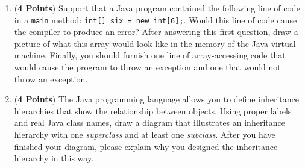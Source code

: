 \documentclass[12pt]{article}
\begin{document}
\begin{enumerate}
\begin{enumerate}

\item ({\bf 4 Points}) Support that a Java program contained the
  following line of code in a {\tt main} method: {\tt int[] six = new
    int[6];}.  Would this line of code cause the compiler to produce
  an error?  After answering this first question, draw a picture of
  what this array would look like in the memory of the Java virtual
  machine.  Finally, you should furnish one line of array-accessing
  code that would cause the program to throw an exception and one that
  would not throw an exception.

\item ({\bf 4 Points}) The Java programming language allows you to
  define inheritance hierarchies that show the relationship between
  objects.  Using proper labels and real Java class names, draw a
  diagram that illustrates an inheritance hierarchy with one {\em
    superclass} and at least one {\em subclass}.  After you have
  finished your diagram, please explain why you designed the
  inheritance hierarchy in this way.

% 
\end{enumerate}


\end{enumerate}
\end{document}

